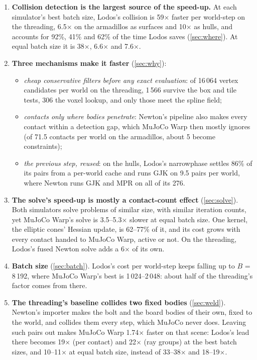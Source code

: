 \begin{enumerate}
\item \textbf{Collision detection is the largest source of the speed-up.} At each simulator's best batch size, Lodos's collision is 59$\times$ faster per world-step on the threading, 6.5$\times$ on the armadillos as surfaces and 10$\times$ as hulls, and accounts for 92\%, 41\% and 62\% of the time Lodos saves (\cref{sec:where}). At equal batch size it is 38$\times$, 6.6$\times$ and 7.6$\times$.
\item \textbf{Three mechanisms make it faster} (\cref{sec:why}):
  \begin{itemize}
  \item \emph{cheap conservative filters before any exact evaluation}: of 16\,064 vertex candidates per world on the threading, 1\,566 survive the box and tile tests, 306 the voxel lookup, and only those meet the spline field;
  \item \emph{contacts only where bodies penetrate}: Newton's pipeline also makes every contact within a detection gap, which MuJoCo Warp then mostly ignores (of 71.5 contacts per world on the armadillos, about 5 become constraints);
  \item \emph{the previous step, reused}: on the hulls, Lodos's narrowphase settles 86\% of its pairs from a per-world cache and runs GJK on 9.5 pairs per world, where Newton runs GJK and MPR on all of its 276.
  \end{itemize}
\item \textbf{The solve's speed-up is mostly a contact-count effect} (\cref{sec:solve}). Both simulators solve problems of similar size, with similar iteration counts, yet MuJoCo Warp's solve is 3.5--5.3$\times$ slower at equal batch size. One kernel, the elliptic cones' Hessian update, is 62--77\% of it, and its cost grows with every contact handed to MuJoCo Warp, active or not. On the threading, Lodos's fused Newton solve adds a 6$\times$ of its own.
\item \textbf{Batch size} (\cref{sec:batch}). Lodos's cost per world-step keeps falling up to $B$ = 8\,192, where MuJoCo Warp's best is 1\,024--2\,048: about half of the threading's factor comes from there.
\item \textbf{The threading's baseline collides two fixed bodies} (\cref{sec:weld}). Newton's importer makes the bolt and the board bodies of their own, fixed to the world, and collides them every step, which MuJoCo never does. Leaving such pairs out makes MuJoCo Warp 1.74$\times$ faster on that scene: Lodos's lead there becomes 19$\times$ (per contact) and 22$\times$ (ray groups) at the best batch sizes, and 10--11$\times$ at equal batch size, instead of 33--38$\times$ and 18--19$\times$.
\end{enumerate}

